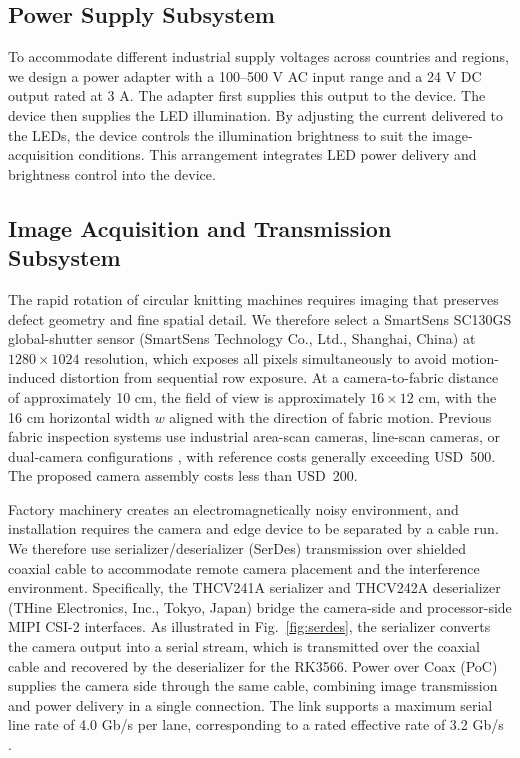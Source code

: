 \documentclass[a4paper,fleqn]{cas-dc}
\begin{document}
\subsection{Power Supply Subsystem}
To accommodate different industrial supply voltages across countries and regions, we design a power adapter with a 100--500 V AC input range and a 24 V DC output rated at 3 A. The adapter first supplies this output to the device. The device then supplies the LED illumination. By adjusting the current delivered to the LEDs, the device controls the illumination brightness to suit the image-acquisition conditions. This arrangement integrates LED power delivery and brightness control into the device.

\subsection{Image Acquisition and Transmission Subsystem}
The rapid rotation of circular knitting machines requires imaging that preserves defect geometry and fine spatial detail. We therefore select a SmartSens SC130GS global-shutter sensor (SmartSens Technology Co., Ltd., Shanghai, China) at $1280\times1024$ resolution, which exposes all pixels simultaneously to avoid motion-induced distortion from sequential row exposure. At a camera-to-fabric distance of approximately 10 cm, the field of view is approximately $16\times12$ cm, with the 16 cm horizontal width $w$ aligned with the direction of fabric motion. Previous fabric inspection systems use industrial area-scan cameras, line-scan cameras, or dual-camera configurations \cite{kuo2022woveninspection,celik2022circular,machado2025edgefabric,zhao2020edgecloud}, with reference costs generally exceeding USD~500. The proposed camera assembly costs less than USD~200.

Factory machinery creates an electromagnetically noisy environment, and installation requires the camera and edge device to be separated by a cable run. We therefore use serializer/deserializer (SerDes) transmission over shielded coaxial cable to accommodate remote camera placement and the interference environment. Specifically, the THCV241A serializer and THCV242A deserializer (THine Electronics, Inc., Tokyo, Japan) bridge the camera-side and processor-side MIPI CSI-2 interfaces. As illustrated in Fig.~\ref{fig:serdes}, the serializer converts the camera output into a serial stream, which is transmitted over the coaxial cable and recovered by the deserializer for the RK3566. Power over Coax (PoC) supplies the camera side through the same cable, combining image transmission and power delivery in a single connection. The link supports a maximum serial line rate of 4.0 Gb/s per lane, corresponding to a rated effective rate of 3.2 Gb/s \cite{thineTHCV241A,thineTHCV242A}.
\end{document}
